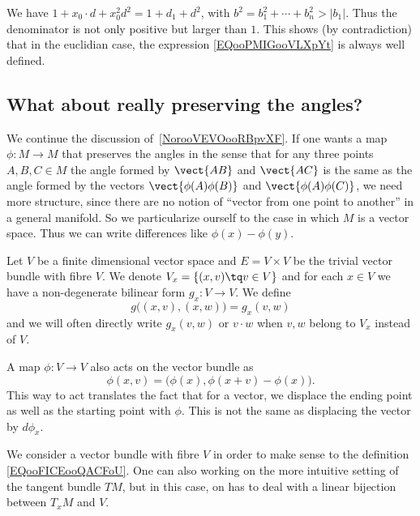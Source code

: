 We have \( 1+x_0\cdot d+x_0^2d^2=1+d_1+d^2\), with \( b^2=b_1^2+\cdots+ b_n^2>|b_1|\). Thus the denominator is not only positive but larger than \( 1\). This shows (by contradiction) that in the euclidian case, the expression \eqref{EQooPMIGooVLXpYt} is always well defined.

\subsection{What about really preserving the angles?}
\label{sebsecooCBKEooQOWqFo}

We continue the discussion of~\ref{NorooVEVOooRBpvXF}. If one wants a map \( \phi\colon M\to M\) that preserves the angles in the sense that for any three points \( A,B,C\in M\) the angle formed by \( \vect{ AB }\) and \( \vect{ AC }\) is the same as the angle formed by the vectors \( \vect{ \phi(A)\phi(B) }\) and \( \vect{ \phi(A)\phi(C) }\), we need more structure, since there are no notion of ``vector from one point to another'' in a general manifold. So we particularize ourself to the case in which \( M\) is a vector space. Thus we can write differences like \( \phi(x)-\phi(y)\).

Let \( V\) be a finite dimensional vector space and \( E=V\times V\) be the trivial vector bundle with fibre \( V\). We denote \( V_x=\{ (x,v)\tq v\in V \}\) and for each \( x\in V\) we have a non-degenerate bilinear form \( g_x\colon V\to V\). We define
\begin{equation}
	g\big( (x,v),(x,w) \big)=g_x(v,w)
\end{equation}
and we will often directly write \( g_x(v,w)\) or \( v\cdot w\) when \( v,w\) belong to \(V_x\) instead of \( V\).

A map \( \phi\colon V\to V\) also acts on the vector bundle as
\begin{equation}        \label{EQooFICEooQACFoU}
	\phi(x,v)=\big( \phi(x),\phi(x+v)-\phi(x) \big).
\end{equation}
This way to act translates the fact that for a vector, we displace the ending point as well as the starting point with \( \phi\). This is not the same as displacing the vector by \( d\phi_x\).

\begin{remark}
	We consider a vector bundle with fibre \( V\) in order to make sense to the definition \eqref{EQooFICEooQACFoU}. One can also working on the more intuitive setting of the tangent bundle \( TM\), but in this case, on has to deal with a linear bijection between \( T_xM\) and \( V\).
\end{remark}

